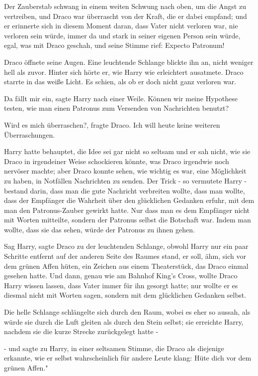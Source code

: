 Der Zauberstab schwang in einem weiten Schwung nach oben, um die Angst zu
vertreiben, und Draco war überrascht von der Kraft, die er dabei empfand; und er
erinnerte sich in diesem Moment daran, dass Vater nicht verloren war, nie
verloren sein würde, immer da und stark in seiner eigenen Person sein würde,
egal, was mit Draco geschah, und seine Stimme rief: \glqq{}Expecto Patronum!

Draco öffnete seine Augen. Eine leuchtende Schlange blickte ihn an, nicht
weniger hell als zuvor. Hinter sich hörte er, wie Harry wie erleichtert
ausatmete. Draco starrte in das weiße Licht. Es schien, als ob er doch nicht
ganz verloren war.

\glqq{}Da fällt mir ein\grqq{}, sagte Harry nach einer Weile. \glqq{}Können wir
meine Hypothese testen, wie man einen Patronus zum Versenden von Nachrichten
benutzt?\grqq{}

\glqq{}Wird es mich überraschen?\grqq{}, fragte Draco. \glqq{}Ich will heute keine
weiteren Überraschungen.\grqq{}

Harry hatte behauptet, die Idee sei gar nicht so seltsam und er sah nicht, wie
sie Draco in irgendeiner Weise schockieren könnte, was Draco irgendwie noch
nervöser machte; aber Draco konnte sehen, wie wichtig es war, eine Möglichkeit
zu haben, in Notfällen Nachrichten zu senden. Der Trick - so vermutete Harry -
bestand darin, dass man die gute Nachricht verbreiten wollte, dass man wollte,
dass der Empfänger die Wahrheit über den glücklichen Gedanken erfuhr, mit dem
man den Patronus-Zauber gewirkt hatte. Nur dass man es dem Empfänger nicht mit
Worten mitteilte, sondern der Patronus selbst die Botschaft war. Indem man
wollte, dass sie das sehen, würde der Patronus zu ihnen gehen. \glqq

Sag Harry\grqq{}, sagte Draco zu der leuchtenden Schlange, obwohl Harry nur ein
paar Schritte entfernt auf der anderen Seite des Raumes stand, \glqq{}er soll,
ähm, sich vor dem grünen Affen hüten\grqq{}, ein Zeichen aus einem Theaterstück,
das Draco einmal gesehen hatte. Und dann, genau wie am Bahnhof King's Cross,
wollte Draco Harry wissen lassen, dass Vater immer für ihn gesorgt hatte; nur
wollte er es diesmal nicht mit Worten sagen, sondern mit dem glücklichen
Gedanken selbst.

Die helle Schlange schlängelte sich durch den Raum, wobei es eher so aussah, als
würde sie durch die Luft gleiten als durch den Stein selbst; sie erreichte
Harry, nachdem sie die kurze Strecke zurückgelegt hatte -

- und sagte zu Harry, in einer seltsamen Stimme, die Draco als diejenige
erkannte, wie er selbst wahrscheinlich für andere Leute klang: \glqq{}Hüte dich
vor dem grünen Affen."

